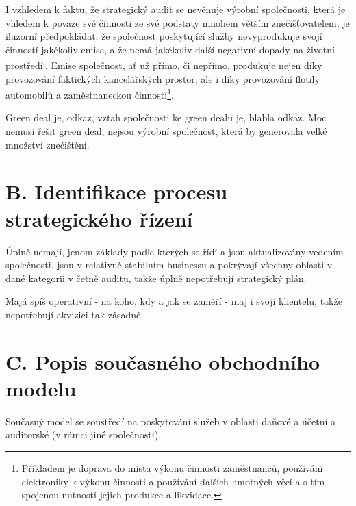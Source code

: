 I vzhledem k faktu, že strategický audit se nevěnuje výrobní společnosti, která je vhledem k povaze své činnosti ze své podstaty mnohem větším znečišťovatelem, je iluzorní předpokládat, že společnost poskytující služby nevyprodukuje svojí činností jakékoliv emise, a že nemá jakékoliv další negativní dopady na životní prostředí\textsuperscript{,}. Emise společnost, ať už přímo, či nepřímo, produkuje nejen díky provozování faktických kancelářských prostor, ale i díky provozování flotily automobilů a zaměstnaneckou činností\footnote{Příkladem je doprava do místa výkonu činnosti zaměstnanců, používání elektroniky k výkonu činnosti a používání dalších hmotných věcí a s tím spojenou nutností jejich produkce a likvidace.}. 



Green deal je, odkaz, vztah společnosti ke green dealu je, blabla odkaz. Moc nemusí řešit green deal, nejsou výrobní společnost, která by generovala velké množství znečištění.

\section*{B. Identifikace procesu strategického řízení}
\label{sec:Identifikace procesu strategickeho rizeni}

Úplně nemají, jenom základy podle kterých se řídí a jsou aktualizovány vedením společnosti, jsou v relativně stabilním businessu a pokrývají všechny oblasti v dané kategorii v četně auditu, takže úplně nepotřebují strategický plán.

Majá spíš operativní - na koho, kdy a jak se zaměří - maj i svojí klientelu, takže nepotřebují akvizici tak zásadně.

\section*{C. Popis současného obchodního modelu}
\label{sec:Popis soucasneho obchodniho modelu}

Současný model se soustředí na poskytování služeb v oblasti daňové a účetní a auditorské (v rámci jiné společnosti).

